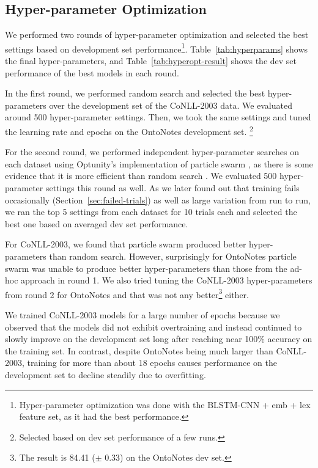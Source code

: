\documentclass[11pt,letterpaper]{article}
\begin{document}
\subsection{Hyper-parameter Optimization}
\label{sec:hyperopt}

We performed two rounds of hyper-parameter optimization and selected the best settings based on development set performance\footnote{Hyper-parameter optimization was done with the BLSTM-CNN + emb + lex feature set, as it had the best performance.}. Table~\ref{tab:hyperparams} shows the final hyper-parameters, and Table~\ref{tab:hyperopt-result} shows the dev set performance of the best models in each round.  

In the first round, we performed random search and selected the best hyper-parameters over the development set of the CoNLL-2003 data. We evaluated around 500 hyper-parameter settings. Then, we took the same settings and tuned the learning rate and epochs on the OntoNotes development set.
\footnote{Selected based on dev set performance of a few runs.}

For the second round, we performed independent hyper-parameter searches on each dataset using Optunity's implementation of particle swarm \cite{claesen2014}, as there is some evidence that it is more efficient than random search \cite{clerc2002}. We evaluated 500 hyper-parameter settings this round as well. As we later found out that training fails occasionally (Section~\ref{sec:failed-trials}) as well as large variation from run to run, we ran the top 5 settings from each dataset for 10 trials each and selected the best one based on averaged dev set performance.

For CoNLL-2003, we found that particle swarm produced better hyper-parameters than random search. However, surprisingly for OntoNotes particle swarm was unable to produce better hyper-parameters than those from the ad-hoc approach in round 1. We also tried tuning the CoNLL-2003 hyper-parameters from round 2 for OntoNotes and that was not any better\footnote{The result is 84.41 ($\pm$ 0.33) on the OntoNotes dev set.} either.

We trained CoNLL-2003 models for a large number of epochs because we observed that the models did not exhibit overtraining and instead continued to slowly improve on the development set long after reaching near 100\% accuracy on the training set. In contrast, despite OntoNotes being much larger than CoNLL-2003, training for more than about 18 epochs causes performance on the development set to decline steadily due to overfitting.
\end{document}
